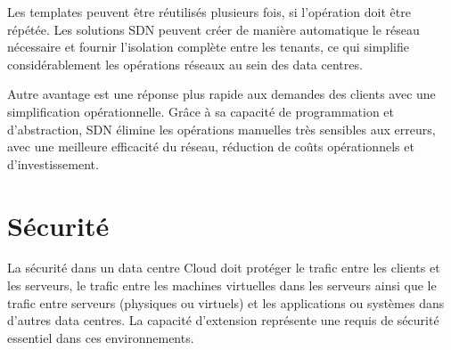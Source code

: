 Les templates peuvent être réutilisés plusieurs fois, si l'opération doit être répétée. Les solutions SDN peuvent créer de manière automatique le réseau nécessaire et fournir l'isolation complète entre les tenants, ce qui simplifie considérablement les opérations réseaux au sein des data centres. 

Autre avantage est une réponse plus rapide aux demandes des clients avec une simplification opérationnelle. Grâce à sa capacité de programmation et d'abstraction, SDN élimine les opérations manuelles très sensibles aux erreurs, avec une meilleure efficacité du réseau, réduction de coûts opérationnels et d'investissement. \cite{leveragingSDNCloudNetworkServiceExample} \cite{leveragingSDNCloudDCWAN}

\section{Sécurité}

La sécurité dans un data centre Cloud doit protéger le trafic entre les clients et les serveurs, le trafic entre les machines virtuelles dans les serveurs ainsi que le trafic entre serveurs (physiques ou virtuels) et les applications ou systèmes dans d'autres data centres. La capacité d'extension représente une requis de sécurité essentiel dans ces environnements. 




